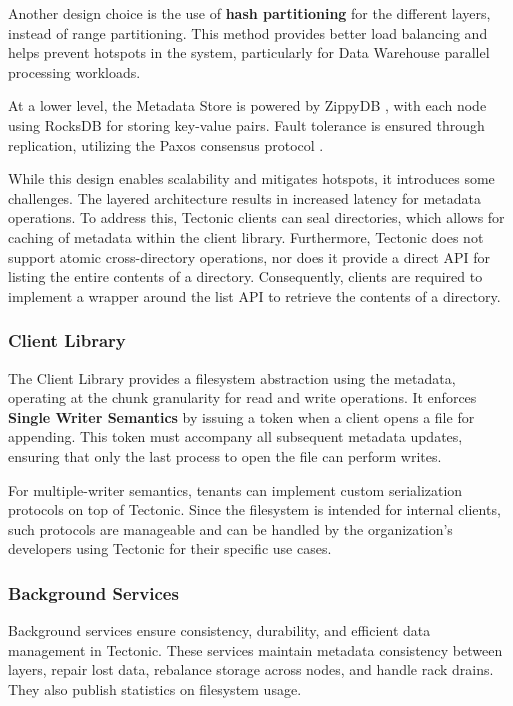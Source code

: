Another design choice is the use of \textbf{hash partitioning} for the different layers, instead of range partitioning. This method provides better load balancing and helps prevent hotspots in the system, particularly for Data Warehouse parallel processing workloads.

At a lower level, the Metadata Store is powered by ZippyDB \cite{zippydb}, with each node using RocksDB \cite{rocksdb} for storing key-value pairs. Fault tolerance is ensured through replication, utilizing the Paxos consensus protocol \cite{paxos}.

While this design enables scalability and mitigates hotspots, it introduces some challenges. The layered architecture results in increased latency for metadata operations. To address this, Tectonic clients can seal directories, which allows for caching of metadata within the client library. Furthermore, Tectonic does not support atomic cross-directory operations, nor does it provide a direct API for listing the entire contents of a directory. Consequently, clients are required to implement a wrapper around the list API to retrieve the contents of a directory.


\subsubsection{Client Library} \label{sec:client_library}

The Client Library provides a filesystem abstraction using the metadata, operating at the chunk granularity for read and write operations. It enforces \textbf{Single Writer Semantics} by issuing a token when a client opens a file for appending. This token must accompany all subsequent metadata updates, ensuring that only the last process to open the file can perform writes.

For multiple-writer semantics, tenants can implement custom serialization protocols on top of Tectonic. Since the filesystem is intended for internal clients, such protocols are manageable and can be handled by the organization's developers using Tectonic for their specific use cases.


\subsubsection{Background Services} \label{sec:background_services}

Background services ensure consistency, durability, and efficient data management in Tectonic. These services maintain metadata consistency between layers, repair lost data, rebalance storage across nodes, and handle rack drains. They also publish statistics on filesystem usage.

